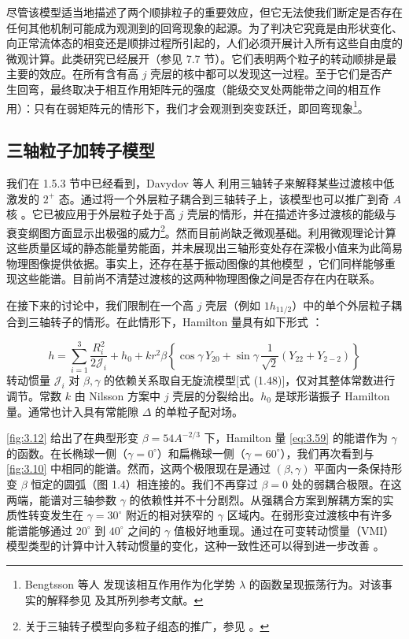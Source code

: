 尽管该模型适当地描述了两个顺排粒子的重要效应，但它无法使我们断定是否存在任何其他机制可能成为观测到的回弯现象的起源。为了判决它究竟是由形状变化、向正常流体态的相变还是顺排过程所引起的，人们必须开展计入所有这些自由度的微观计算。此类研究已经展开（参见
7.7 节）。它们表明两个粒子的转动顺排是最主要的效应。在所有含有高 $j$ 壳层的核中都可以发现这一过程。至于它们是否产生回弯，最终取决于相互作用矩阵元的强度（能级交叉处两能带之间的相互作用）：只有在弱矩阵元的情形下，我们才会观测到突变跃迁，即回弯现象\footnote{Bengtsson 等人 \cite{BHM78} 发现该相互作用作为化学势 $\lambda$ 的函数呈现振荡行为。对该事实的解释参见
\cite{FPS80} 及其所列参考文献。}。

\subsection{三轴粒子加转子模型}

我们在 1.5.3 节中已经看到，Davydov 等人 \cite{DF58} 利用三轴转子来解释某些过渡核中低激发的 $2^{+}$
态。通过将一个外层粒子耦合到三轴转子上，该模型也可以推广到奇 $A$ 核 \cite{Pa61,HS62,PR62,PS65,MSD74,Me75,FT75,TF75,Le76,DF77,LLR78}。它已被应用于外层粒子处于高
$j$ 壳层的情形，并在描述许多过渡核的能级与衰变纲图方面显示出极强的威力\footnote{关于三轴转子模型向多粒子组态的推广，参见 \cite{TNV77,YTF77,TYF77,YTF78}。}。然而目前尚缺乏微观基础。利用微观理论计算这些质量区域的静态能量势能面，并未展现出三轴形变处存在深极小值来为此简易物理图像提供依据。事实上，还存在基于振动图像的其他模型
\cite{AP76,PVD77,YNN76}，它们同样能够重现这些能谱。目前尚不清楚过渡核的这两种物理图像之间是否存在内在联系。

在接下来的讨论中，我们限制在一个高 $j$ 壳层（例如 $1h_{11/2}$）中的单个外层粒子耦合到三轴转子的情形。在此情形下，Hamilton
量具有如下形式 \cite{MSD74}：

\begin{equation}
h=\sum^{3}_{i=1}\frac{R^{2}_{i}}{2\mathcal{J}_{i}}+h_{0}+kr^{2}\beta\left\{ \cos\gamma\,Y_{20}+\sin\gamma\,\frac{1}{\sqrt{2}}\left(Y_{22}+Y_{2-2}\right)\right\} \label{eq:3.59}
\end{equation}
转动惯量 $\mathcal{J}_{i}$ 对 $\beta,\gamma$ 的依赖关系取自无旋流模型{[}式 (1.48){]}，仅对其整体常数进行调节。常数
$k$ 由 Nilsson 方案中 $j$ 壳层的分裂给出。$h_{0}$ 是球形谐振子 Hamilton 量。通常也计入具有常能隙
$\Delta$ 的单粒子配对场。

\ref{fig:3.12} 给出了在典型形变 $\beta=54A^{-2/3}$ 下，Hamilton 量 \ref{eq:3.59}
的能谱作为 $\gamma$ 的函数。在长椭球一侧（$\gamma=0^{\circ}$）和扁椭球一侧（$\gamma=60^{\circ}$），我们再次看到与\ref{fig:3.10}
中相同的能谱。然而，这两个极限现在是通过 $(\beta,\gamma)$ 平面内一条保持形变 $\beta$ 恒定的圆弧（图
1.4）相连接的。我们不再穿过 $\beta=0$ 处的弱耦合极限。在这两端，能谱对三轴参数 $\gamma$ 的依赖性并不十分剧烈。从强耦合方案到解耦方案的实质性转变发生在
$\gamma=30^{\circ}$ 附近的相对狭窄的 $\gamma$ 区域内。在弱形变过渡核中有许多能谱能够通过 $20^{\circ}$
到 $40^{\circ}$ 之间的 $\gamma$ 值极好地重现。通过在可变转动惯量（VMI）模型类型的计算中计入转动惯量的变化，这种一致性还可以得到进一步改善
\cite{FT75}。

